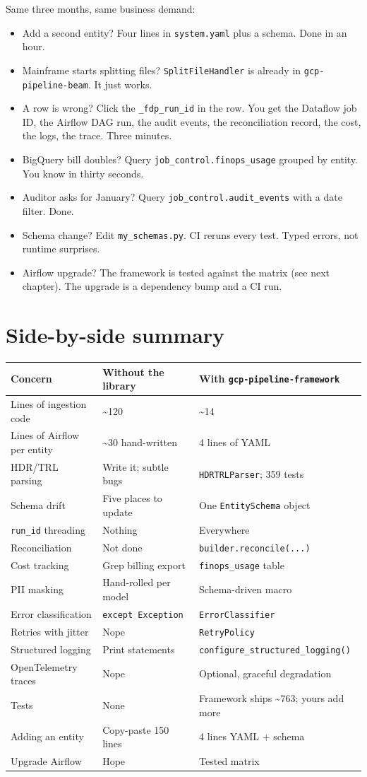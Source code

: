 \documentclass[
  11pt,
  british,
  oneside]{book}
\providecommand{\tightlist}{%
  \setlength{\itemsep}{0pt}\setlength{\parskip}{0pt}}
\begin{document}
Same three months, same business demand:

\begin{itemize}
\tightlist
\item
  Add a second entity? Four lines in \texttt{system.yaml} plus a schema.
  Done in an hour.
\item
  Mainframe starts splitting files? \texttt{SplitFileHandler} is already
  in \texttt{gcp-pipeline-beam}. It just works.
\item
  A row is wrong? Click the \texttt{\_fdp\_run\_id} in the row. You get
  the Dataflow job ID, the Airflow DAG run, the audit events, the
  reconciliation record, the cost, the logs, the trace. Three minutes.
\item
  BigQuery bill doubles? Query \texttt{job\_control.finops\_usage}
  grouped by entity. You know in thirty seconds.
\item
  Auditor asks for January? Query \texttt{job\_control.audit\_events}
  with a date filter. Done.
\item
  Schema change? Edit \texttt{my\_schemas.py}. CI reruns every test.
  Typed errors, not runtime surprises.
\item
  Airflow upgrade? The framework is tested against the matrix (see next
  chapter). The upgrade is a dependency bump and a CI run.
\end{itemize}

\hypertarget{side-by-side-summary}{%
\section{Side-by-side summary}\label{side-by-side-summary}}

\begin{longtable}[]{@{}lll@{}}
\toprule
Concern & Without the library & With
\texttt{gcp-pipeline-framework}\tabularnewline
\midrule
\endhead
Lines of ingestion code & \textasciitilde120 &
\textasciitilde14\tabularnewline
Lines of Airflow per entity & \textasciitilde30 hand-written & 4 lines
of YAML\tabularnewline
HDR/TRL parsing & Write it; subtle bugs & \texttt{HDRTRLParser}; 359
tests\tabularnewline
Schema drift & Five places to update & One \texttt{EntitySchema}
object\tabularnewline
\texttt{run\_id} threading & Nothing & Everywhere\tabularnewline
Reconciliation & Not done &
\texttt{builder.reconcile(...)}\tabularnewline
Cost tracking & Grep billing export & \texttt{finops\_usage}
table\tabularnewline
PII masking & Hand-rolled per model & Schema-driven macro\tabularnewline
Error classification & \texttt{except\ Exception} &
\texttt{ErrorClassifier}\tabularnewline
Retries with jitter & Nope & \texttt{RetryPolicy}\tabularnewline
Structured logging & Print statements &
\texttt{configure\_structured\_logging()}\tabularnewline
OpenTelemetry traces & Nope & Optional, graceful
degradation\tabularnewline
Tests & None & Framework ships \textasciitilde763; yours add
more\tabularnewline
Adding an entity & Copy-paste 150 lines & 4 lines YAML +
schema\tabularnewline
Upgrade Airflow & Hope & Tested matrix\tabularnewline
\bottomrule
\end{longtable}
\end{document}
